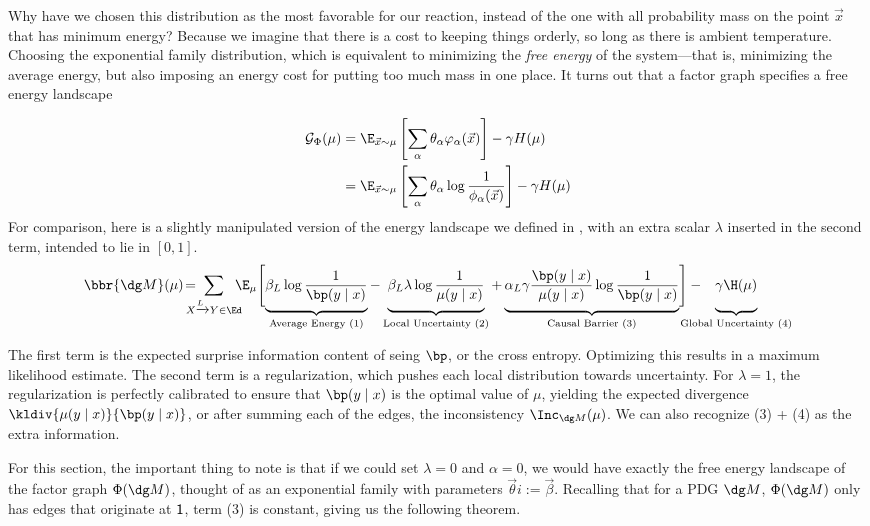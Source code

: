 Why have we chosen this distribution as the most favorable for our reaction, instead of the one with all probability mass on the point $\vec x$ that has minimum energy? Because we imagine that there is a cost to keeping things orderly, so long as there is ambient temperature. Choosing the exponential family distribution, which is equivalent to minimizing the \emph{free energy} of the system---that is, minimizing the average energy, but also imposing an energy cost for putting too much mass in one place. It turns out that a factor graph specifies a free energy landscape

\begin{align*}
	\mathcal G_\Phi(\mu) &=  \E_{\vec x \sim \mu} \left[\sum_\alpha \theta_\alpha \varphi_\alpha(\vec x) \right] - \gamma H(\mu) \\
		&= \E_{\vec x \sim \mu} \left[\sum_\alpha \theta_\alpha \log \frac{1}{\phi_\alpha(\vec x)} \right] - \gamma H(\mu)
\end{align*}
For comparison, here is a slightly manipulated version of the energy landscape we defined in , with an extra scalar $\lambda$ inserted in the second term, intended to lie in $[0,1]$.
\begin{equation*}
	\bbr{\dg M}(\mu) \!=\mskip-18mu \sum_{ X \xrightarrow{\!\!L} Y  \in \Ed } \!\!\!\!\E_\mu  \Bigg[\!
		\underbrace{\beta_L \log \frac{1}{\bp(y\mid x)} \vphantom{\Bigg|}}_{\text{Average Energy (1)}}  - 
		\underbrace{\beta_L \lambda \log \frac{1}{\mu(y \mid x)}  \vphantom{\Bigg|}}_{\text{Local Uncertainty (2)}}  + 
		\underbrace{\alpha_L \gamma \frac{\bp(y \mid x)}{\mu(y \mid x)}\log \frac{1}{\bp(y\mid x)}  \vphantom{\Bigg|}}_{\text{Causal Barrier (3)}}\! \Bigg] - 
		\mskip-31mu\underbrace{\gamma \H(\mu) \vphantom{\Bigg|} }_{\text{Global Uncertainty (4)}}
\end{equation*}

The first term is the expected surprise information content of seing $\bp$, or the cross entropy. Optimizing this results in a maximum likelihood estimate. The second term is a regularization, which pushes each local distribution towards uncertainty. For $\lambda = 1$, the regularization is perfectly calibrated to ensure that $\bp(y \mid x)$ is the optimal value of $\mu$, yielding the expected divergence $\kldiv{\mu(y\mid x)}{\bp(y\mid x)}$, or after summing each of the edges, the inconsistency $\Inc_{\dg M}( \mu)$. We can also recognize (3) + (4) as the extra information.

For this section, the important thing to note is that if we could set $\lambda = 0$ and $\alpha = 0$, we would have exactly the free energy landscape of the factor graph $\Phi(\dg M)$, thought of as an exponential family with parameters $\vec \theta i:= \vec \beta$. Recalling that for a PDG $\dg M$, $\Phi(\dg M)$ only has edges that originate at $\sf 1$, term (3) is constant, giving us the following theorem.

